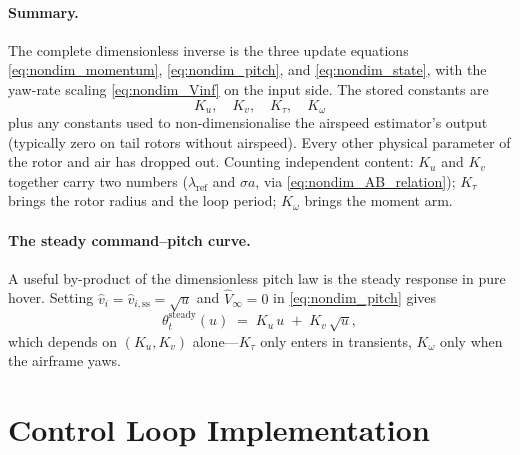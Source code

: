 \documentclass[11pt,a4paper]{article}
\newcommand{\thetat}{\theta_t}
\let\oldsection\section
\renewcommand{\section}{\clearpage\oldsection}
\begin{document}
\paragraph{Summary.}
The complete dimensionless inverse is the three update equations
\eqref{eq:nondim_momentum}, \eqref{eq:nondim_pitch}, and
\eqref{eq:nondim_state}, with the yaw-rate scaling \eqref{eq:nondim_Vinf}
on the input side. The stored constants are
\begin{equation}
K_u,\quad K_v,\quad K_\tau,\quad K_\omega
\label{eq:nondim_paramset}
\end{equation}
plus any constants used to non-dimensionalise the airspeed estimator's
output (typically zero on tail rotors without airspeed). Every other
physical parameter of the rotor and air has dropped out. Counting
independent content: \(K_u\) and \(K_v\) together carry two numbers
(\(\lambda_{\text{ref}}\) and \(\sigma a\), via
\eqref{eq:nondim_AB_relation}); \(K_\tau\) brings the rotor radius and the
loop period; \(K_\omega\) brings the moment arm.

\paragraph{The steady command--pitch curve.}
A useful by-product of the dimensionless pitch law is the steady
response in pure hover. Setting \(\hat{v}_i = \hat{v}_{i,\text{ss}} =
\sqrt{u}\) and \(\hat{V}_\infty = 0\) in \eqref{eq:nondim_pitch} gives
\begin{equation}
\thetat^{\text{steady}}(u) \;=\; K_u\,u \;+\; K_v\,\sqrt{u},
\label{eq:nondim_steady_curve}
\end{equation}
which depends on \((K_u,K_v)\) alone---\(K_\tau\) only enters in transients,
\(K_\omega\) only when the airframe yaws.

\section{Control Loop Implementation}\label{sec:impl}
\end{document}
